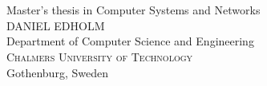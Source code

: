 
\begin{titlepage}
			
\addtolength{\voffset}{2cm}


\mbox{}
\vfill
\renewcommand{\familydefault}{\sfdefault} \normalfont %
\textbf{{\Huge 	\THETITLE}} 	\\[0.5cm]
{\Large \TITLEDESCR }\\[0.5cm]
Master's thesis in Computer Systems and Networks \\[0.5cm]

{\Large DANIEL EDHOLM}\\[2.5cm]

Department of Computer Science and Engineering \\
\textsc{Chalmers University of Technology} \\
Gothenburg, Sweden \the\year

\renewcommand{\familydefault}{\rmdefault} \normalfont %
\end{titlepage}


\newpage
\restoregeometry
\thispagestyle{empty}
\mbox{}


